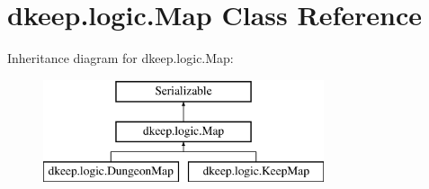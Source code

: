 \hypertarget{classdkeep_1_1logic_1_1_map}{}\section{dkeep.\+logic.\+Map Class Reference}
\label{classdkeep_1_1logic_1_1_map}
Inheritance diagram for dkeep.\+logic.\+Map\+:\begin{figure}[H]
\begin{center}
\leavevmode
\includegraphics[height=3.000000cm]{classdkeep_1_1logic_1_1_map}
\end{center}
\end{figure}
